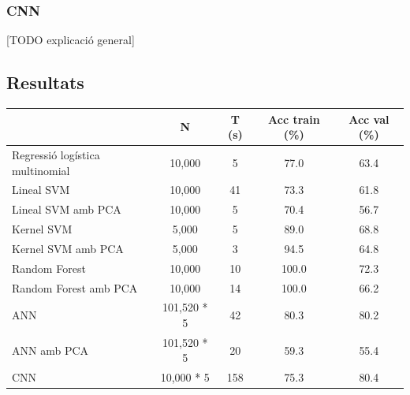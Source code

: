 \documentclass[12pt, spanish]{article}
\begin{document}
\subsubsection{CNN}

[TODO explicació general]










\subsection{Resultats}

\begin{table}[hbt!]
\centering
\begin{tabular}{lcccc}  
\toprule
                                              & N         & T (s)  & Acc train (\%) & Acc val (\%) \\  
\midrule
Regressió logística multinomial  & 10,000 & 5   & 77.0        & 63.4 \\
Lineal SVM                              & 10,000 & 41  & 73.3       & 61.8  \\
Lineal SVM amb PCA                & 10,000 & 5    & 70.4       & 56.7  \\
Kernel SVM                             & 5,000   & 5    & 89.0       & 68.8  \\
Kernel SVM amb PCA               & 5,000   & 3    & 94.5       & 64.8  \\
Random Forest                        & 10,000 & 10  & 100.0     & 72.3 \\
Random Forest amb PCA          & 10,000 & 14  & 100.0     & 66.2  \\
ANN 					     & 101,520 * 5 & 42 & 80.3 & 80.2  \\
ANN amb PCA                         & 101,520 * 5 & 20 & 59.3 & 55.4 \\
CNN					     & 10,000 * 5   & 158 & 75.3 & 80.4 \\
\bottomrule
\end{tabular}
\label{tab:taula2}
\end{table}
\end{document}
